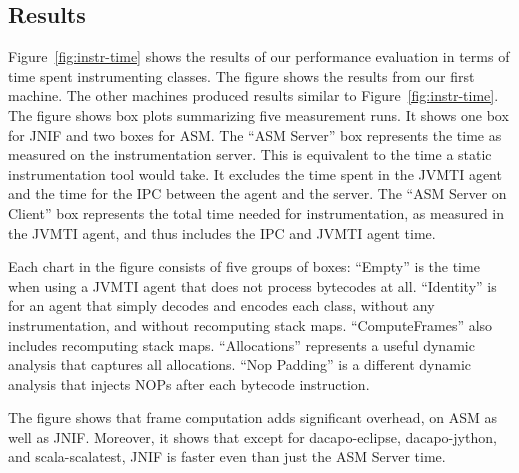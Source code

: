 \subsection*{Results}

Figure~\ref{fig:instr-time} shows the results of our performance evaluation
in terms of time spent instrumenting classes.
The figure shows the results from our first machine.
The other machines produced results similar to Figure~\ref{fig:instr-time}.
The figure shows box plots summarizing five measurement runs.
It shows one box for JNIF and two boxes for ASM.
The ``ASM Server'' box represents the time as measured on the instrumentation server.
This is equivalent to the time a static instrumentation tool would take.
It excludes the time spent in the JVMTI agent and the time for the IPC between the agent and the server.
The ``ASM Server on Client'' box represents the total time needed for instrumentation, 
as measured in the JVMTI agent,
and thus includes the IPC and JVMTI agent time.

Each chart in the figure consists of five groups of boxes:
``Empty'' is the time when using a JVMTI agent that does not process bytecodes at all.
``Identity'' is for an agent that simply decodes and encodes each class, without any instrumentation, and without recomputing stack maps.
``ComputeFrames'' also includes recomputing stack maps.
``Allocations'' represents a useful dynamic analysis that captures all allocations.
``Nop Padding'' is a different dynamic analysis that injects NOPs after each bytecode instruction. 

The figure shows that frame computation adds significant overhead, on ASM as well as JNIF.
Moreover, it shows that except for dacapo-eclipse, dacapo-jython, and scala-scalatest,
JNIF is faster even than just the ASM Server time.




